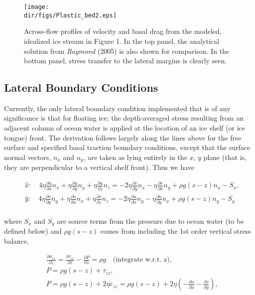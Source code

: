 \begin{figure}
  \begin{center}
    \texttt{[image: \\dir/figs/Plastic\_bed2.eps]}
  \end{center}
  \caption{Across-flow profiles of velocity and basal drag from the modeled, idealized ice stream in Figure 1. In the top panel, the analytical solution from \textit{Raymond} (2005) is also shown for comparison. In the bottom panel, stress transfer to the lateral margins is clearly seen.}
    \label{fig:plasticbed2}
\end{figure} 

\subsection{Lateral Boundary Conditions}
Currently, the only lateral boundary condition implemented that is of any significance is that for floating ice; the depth-averaged stress resulting from an adjacent column of ocean water is applied at the location of an ice shelf (or ice tongue) front. The derivation follows largely along the lines above for the free surface and specified basal traction boundary conditions, except that the surface normal vectors, $n_{x}$ and $n_{y}$, are taken as lying entirely in the $x$, $y$ plane (that is, they are perpendicular to a vertical shelf front). Thus we have

\begin{align*}
  & \hat{x}:\quad 4\eta \frac{\partial u}{\partial x}n_{x}+\eta \frac{\partial u}{\partial y}n_{y}+\eta \frac{\partial u}{\partial z}n_{z}=-2\eta \frac{\partial v}{\partial y}n_{x}-\eta \frac{\partial v}{\partial x}n_{y}+\rho g\left( s-z \right)n_{x}-S_{x}, \\ 
 & \hat{y}:\quad 4\eta \frac{\partial v}{\partial y}n_{y}+\eta \frac{\partial v}{\partial x}n_{x}+\eta \frac{\partial v}{\partial z}n_{z}=-2\eta \frac{\partial u}{\partial x}n_{y}-\eta \frac{\partial u}{\partial y}n_{x}+\rho g\left( s-z \right)n_{y}-S_{y} \\ 
\end{align*}

where $S_x$ and $S_y$ are source terms from the pressure due to ocean water (to be defined below) and $\rho g\left( s-z \right)$ comes from including the 1st order vertical stress balance,

\begin{align*}
  & \frac{\partial \sigma _{zz}}{\partial z}=\frac{\partial \tau _{zz}}{\partial z}-\frac{\partial P}{\partial z}=\rho g\quad \text{(integrate w}\text{.r}\text{.t}\text{. z)}, \\ 
 & P=\rho g\left( s-z \right)+\tau _{zz}, \\ 
 & P=\rho g\left( s-z \right)+2\eta \dot{\varepsilon }_{zz}=\rho g\left( s-z \right)+2\eta \left( -\frac{\partial u}{\partial x}-\frac{\partial v}{\partial y} \right), \\ 
\end{align*}

